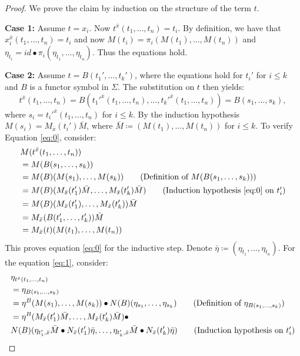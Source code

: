 \documentclass[11pt]{article}
\theoremstyle{plain}
\theoremstyle{definition}
\numberwithin{equation}{section}
\begin{document}
\begin{proof}
We prove the claim by induction on the structure of the term $t$.

\noindent\textbf{Case 1:} Assume $t = x_i$. Now $t^{\bar{x}}(t_1,\ldots, t_n) = t_i$. By definition, we have that $x_i^{\bar{x}}(t_1, \dots, t_n) = t_i$ and now $M(t_i) = \pi_i(M(t_1),\ldots, M(t_n))$ and $\eta_{t_i} = id\bullet \pi_i(\eta_{t_1},\ldots, \eta_{t_n})$. Thus the equations hold.


\noindent\textbf{Case 2:} Assume $t = B(t_1',\ldots, t_k')$, where the equations hold for $t_i'$ for $i\leq k$ and $B$ is a functor symbol in $\Sigma$. 
The substitution on $t$ then yields:
\[
t^{\bar{x}}(t_1, \dots, t_n) = B(t_1'^{\bar{x}}(t_1,\ldots, t_n),\ldots, t_k'^{\bar{x}}(t_1,\ldots, t_n))= B(s_1, \dots, s_k),
\]
where $s_i = t_i'^{\bar{x}}(t_1,\ldots, t_n)$ for $i\leq k$. By the induction hypothesis $M(s_i) = M_{\bar{x}}(t_i')\bar{M}$, where $\bar{M}\coloneqq (M(t_1),\ldots, M(t_n))$ for $i\leq k$.
To verify Equation \eqref{eq:0}, consider:
\begin{align*}
   &M(t^{\bar{x}}(t_1, \dots, t_n)) \\
   &= M(B(s_1, \dots, s_k)) \\
   &= M(B)(M(s_1), \dots, M(s_k)) \tag{Definition of $M(B(s_1,\dots, s_k))$} \\
   &= M(B) (M_{\bar{x}}(t'_1)\bar{M}, \dots, M_{\bar{x}}(t'_k)\bar{M}) \tag{Induction hypothesis \eqref{eq:0} on $t'_i$} \\
   &= M(B) (M_{\bar{x}}(t'_1), \dots, M_{\bar{x}}(t'_k)) \bar{M} \\
   &= M_{\bar{x}}(B(t'_1, \dots, t'_k))\bar{M} \\
   &= M_{\bar{x}}(t)(M(t_1), \dots, M(t_n))
\end{align*}
This proves equation \eqref{eq:0} for the inductive step. Denote $\bar{\eta}\coloneqq (\eta_{t_1},\ldots, \eta_{t_n})$. For the equation \eqref{eq:1}, consider:
{
\begin{align*}
   &\eta_{t^{\bar{x}}(t_1,\ldots, t_n)}\\
   &= \eta_{B(s_1,\ldots, s_k)}\\
   &= \eta^B (M(s_1),\ldots, M(s_k)) \bullet N(B)(\eta_{s_1},\ldots, \eta_{s_k}) \tag{Definition of $\eta_{B(s_1,\ldots, s_k)}$}\\
   &= \eta^B(M_{\bar{x}}(t_1')\bar{M},\ldots, M_{\bar{x}}(t_k')\bar{M})\bullet\\
   & N(B)(\eta_{t_1',\bar{x}}\bar{M} \bullet N_{\bar{x}}(t_1')\bar{\eta},\ldots, \eta_{t_k',\bar{x}}\bar{M}\bullet N_{\bar{x}}(t_k')\bar{\eta}) \tag{Induction hypothesis on $t_i'$}\\

\end{align*}}
\end{proof}
\end{document}
